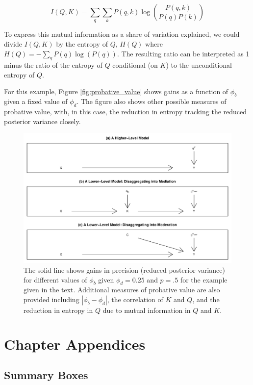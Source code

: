 \documentclass[12pt,]{book}
\begin{document}
\[I(Q,K) = \sum_q \sum_k P(q,k)\log\left(\frac{P(q,k)}{P(q)P(k)}\right)\]

To express this mutual information as a share of variation explained, we could divide \(I(Q,K)\) by the entropy of \(Q\), \(H(Q)\) where \(H(Q) = -\sum_qP(q)\log(P(q))\). The resulting ratio can be interpreted as 1 minus the ratio of the entropy of \(Q\) conditional (on \(K\)) to the unconditional entropy of \(Q\).

For this example, Figure \ref{fig:probative_value} shows gains as a function of \(\phi_b\) given a fixed value of \(\phi_d\). The figure also shows other possible measures of probative value, with, in this case, the reduction in entropy tracking the reduced posterior variance closely.

\begin{figure}

{\centering \includegraphics[width=.7\textwidth]{ii_files/figure-latex/unnamed-chunk-12-1} 

}

\caption{\label{fig:probative_value} The solid line shows gains in precision (reduced posterior variance) for different values of $\phi_b$ given $\phi_d=0.25$ and $p=.5$ for the example given in the text. Additional measures of probative value are also provided including $|\phi_b - \phi_d|$, the correlation of $K$ and $Q$, and the reduction in entropy in $Q$ due to mutual information in $Q$ and $K$.}\label{fig:unnamed-chunk-12}
\end{figure}

\hypertarget{chapter-appendices}{%
\section{Chapter Appendices}\label{chapter-appendices}}

\hypertarget{summary-boxes}{%
\subsection{Summary Boxes}\label{summary-boxes}}
\end{document}
